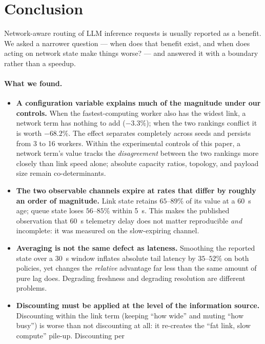 \section{Conclusion}
\label{sec:conclusion}

Network-aware routing of LLM inference requests is usually reported as a benefit. We asked a
narrower question --- when does that benefit exist, and when does acting on network state make
things worse? --- and answered it with a boundary rather than a speedup.

\paragraph{What we found.}
\begin{itemize}
  \item \textbf{A configuration variable explains much of the magnitude under our controls.}
        When the fastest-computing
        worker also has the widest link, a network term has nothing to add ($-3.3\%$); when the
        two rankings conflict it is worth $-68.2\%$. The effect separates completely across seeds
        and persists from 3 to 16 workers. Within the experimental controls of this paper, a
        network term's value tracks the \emph{disagreement} between the two rankings more closely
        than link speed alone; absolute capacity ratios, topology, and payload size remain
        co-determinants.
  \item \textbf{The two observable channels expire at rates that differ by roughly an order of
        magnitude.} Link state retains $65$--$89\%$ of its value at a \SI{60}{\second} age; queue
        state loses $56$--$85\%$ within \SI{5}{\second}. This makes the published observation
        that \SI{60}{\second} telemetry delay does not matter reproducible \emph{and} incomplete:
        it was measured on the slow-expiring channel.
  \item \textbf{Averaging is not the same defect as lateness.} Smoothing the reported state over
        a \SI{30}{\second} window inflates absolute tail latency by $35$--$52\%$ on both policies,
        yet changes the \emph{relative} advantage far less than the same amount of pure lag does.
        Degrading freshness and degrading resolution are different problems.
  \item \textbf{Discounting must be applied at the level of the information source.} Discounting
        within the link term (keeping ``how wide'' and muting ``how busy'') is worse than not
        discounting at all: it re-creates the ``fat link, slow compute'' pile-up. Discounting per

\end{itemize}
